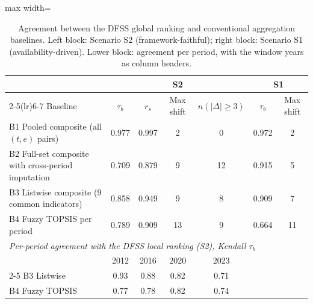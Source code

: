\begin{table}[pos=t]\centering\footnotesize
\caption{Agreement between the DFSS global ranking and conventional aggregation baselines. Left block: Scenario S2 (framework-faithful); right block: Scenario S1 (availability-driven). Lower block: agreement per period, with the window years as column headers.}
\label{tab:baselines}
\begin{adjustbox}{max width=\linewidth}\begin{tabular}{@{}lcccccc@{}}\toprule
 & \multicolumn{4}{c}{S2} & \multicolumn{2}{c}{S1} \\ \cmidrule(lr){2-5}\cmidrule(lr){6-7}
Baseline & $\tau_b$ & $r_s$ & Max shift & $n(|\Delta|\ge3)$ & $\tau_b$ & Max shift \\ \midrule
B1 Pooled composite (all $(t,e)$ pairs) & 0.977 & 0.997 & 2 & 0 & 0.972 & 2 \\
B2 Full-set composite with cross-period imputation & 0.709 & 0.879 & 9 & 12 & 0.915 & 5 \\
B3 Listwise composite (9 common indicators) & 0.858 & 0.949 & 9 & 8 & 0.909 & 7 \\
B4 Fuzzy TOPSIS per period & 0.789 & 0.909 & 13 & 9 & 0.664 & 11 \\
\midrule \multicolumn{7}{l}{\emph{Per-period agreement with the DFSS local ranking (S2), Kendall $\tau_b$}} \\
 & 2012 & 2016 & 2020 & 2023 & & \\ \cmidrule(lr){2-5}
B3 Listwise & 0.93 & 0.88 & 0.82 & 0.71 & & \\
B4 Fuzzy TOPSIS & 0.77 & 0.78 & 0.82 & 0.74 & & \\
\bottomrule\end{tabular}\end{adjustbox}\end{table}
